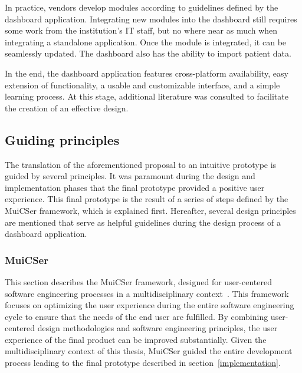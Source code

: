     In practice, vendors develop modules according to guidelines defined by the dashboard application. Integrating new modules into the dashboard still requires some work from the institution's IT staff, but no where near as much when integrating a standalone application. Once the module is integrated, it can be seamlessly updated. The dashboard also has the ability to import patient data.\bigskip

    \noindent In the end, the dashboard application features cross-platform availability, easy extension of functionality, a usable and customizable interface, and a simple learning process. At this stage, additional literature was consulted to facilitate the creation of an effective design.

    \subsection{Guiding principles}\label{guiding_principles}

    The translation of the aforementioned proposal to an intuitive prototype is guided by several principles. It was paramount during the design and implementation phases that the final prototype provided a positive user experience. This final prototype is the result of a series of steps defined by the MuiCSer framework, which is explained first. Hereafter, several design principles are mentioned that serve as helpful guidelines during the design process of a dashboard application.

        \subsubsection{MuiCSer}\label{muicser}
        This section describes the MuiCSer framework, designed for user-centered software engineering processes in a multidisciplinary context~\cite{Haesen2008}. This framework focuses on optimizing the user experience during the entire software engineering cycle to ensure that the needs of the end user are fulfilled. By combining user-centered design methodologies and software engineering principles, the user experience of the final product can be improved substantially. Given the multidisciplinary context of this thesis, MuiCSer guided the entire development process leading to the final prototype described in section~\ref{implementation}.
        

